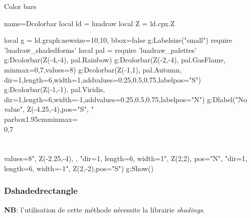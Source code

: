 \begin{demo}{Color bars}
\begin{luadraw}{name=Dcolorbar}
local ld = luadraw
local Z = ld.cpx.Z

local g = ld.graph:new{size={10,10}, bbox=false}
g:Labelsize("small")
require 'luadraw_shadedforms'
local pal = require 'luadraw_palettes'
g:Dcolorbar(Z(-4,-4), pal.Rainbow)
g:Dcolorbar(Z(-2,-4), pal.GasFlame, {minmax={0,7},values=8})
g:Dcolorbar(Z(-1,1), pal.Autumn, {dir=1,length=6,width=1,addvalues={0.25,0.5,0.75},labelpos="S"})
g:Dcolorbar(Z(-1,-1), pal.Viridis, {dir=1,length=6,width=-1,addvalues={0.25,0.5,0.75},labelpos="N"})
g:Dlabel("No value", Z(-4.25,-4),{pos="S"},
    "\\parbox{1.95cm}{minmax=\\{0,7\\}\\\\values=8}", Z(-2.25,-4), {},
    "dir=1, length=6, width=1", Z(2,2), {pos="N"},
    "dir=1, length=6, width=-1", Z(2,-2),{pos="S"})
g:Show()
\end{luadraw}
\end{demo}

\subsubsection{Dshadedrectangle}

\noindent\textbf{NB}: l'utilisation de cette méthode nécessite la librairie \emph{shadings}.


